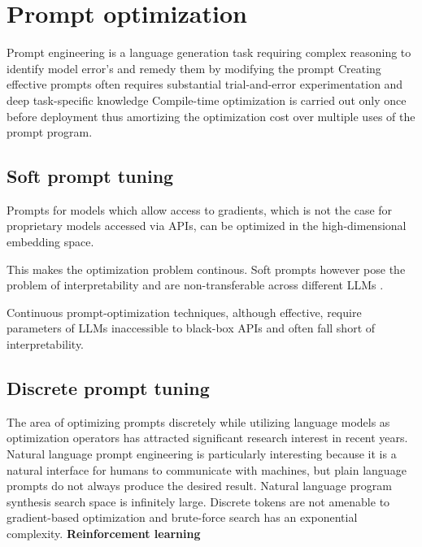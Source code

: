 \section{Prompt optimization}
Prompt engineering is a language generation task requiring complex reasoning to identify model error's and remedy them by modifying the prompt \cite{ye2024promptengineeringpromptengineer}
Creating effective prompts often requires substantial trial-and-error experimentation and deep task-specific knowledge \cite{xiang2025selfsupervisedpromptoptimization}
Compile-time optimization is carried out only once before deployment thus amortizing the optimization cost over multiple uses of the prompt program. \cite{schnabel2024symbolicpromptprogramsearch}

\subsection{Soft prompt tuning}
Prompts for models which allow access to gradients, which is not the case for proprietary models accessed via APIs, can be optimized in the high-dimensional embedding space.

This makes the optimization problem continous. Soft prompts however pose the problem of interpretability and are non-transferable across different LLMs \cite{deng2022rlpromptoptimizingdiscretetext}.

Continuous prompt-optimization techniques, although effective, require parameters of LLMs inaccessible to black-box APIs and often fall short of interpretability. \cite{guo2024connectinglargelanguagemodels}

\subsection{Discrete prompt tuning}
The area of optimizing prompts discretely while utilizing language models as optimization operators has attracted significant research interest in recent years.
Natural language prompt engineering is particularly interesting because it is a natural interface for humans to communicate with machines, but plain language prompts do not always produce the desired result. \cite{zhou2023largelanguagemodelshumanlevel}
Natural language program synthesis search space is infinitely large. \cite{zhou2023largelanguagemodelshumanlevel}
Discrete tokens are not amenable to gradient-based optimization and brute-force search has an exponential complexity. \cite{deng2022rlpromptoptimizingdiscretetext}
\textbf{Reinforcement learning}

